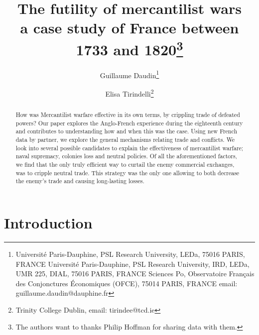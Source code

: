 \documentclass[12pt,a4paper,notitlepage,english]{article}
\author{
  Guillaume Daudin\thanks{Université Paris-Dauphine, PSL Research University, LEDa, 75016 PARIS, FRANCE Université Paris-Dauphine, PSL Research University, IRD, LEDa, UMR 225, DIAL, 75016 PARIS, FRANCE Sciences Po, Observatoire Français des Conjonctures Économiques (OFCE), 75014 PARIS, FRANCE email: guillaume.daudin@dauphine.fr}
  \and
  Elisa Tirindelli\thanks{Trinity College Dublin, email: tirindee@tcd.ie}
}
\title{The futility of mercantilist wars \\ a case study of France between 1733 and 1820\thanks{The authors want to thanks Philip Hoffman for sharing data with them.}}
\date{}
\begin{document}
\maketitle






\begin{abstract}
How was Mercantilist warfare effective in its own terms, by crippling trade of defeated powers? Our paper explores the Anglo-French experience during the eighteenth century and contributes to understanding how and when this was the case. Using new French data by partner, we explore the general mechanisms relating trade and conflicts. We look into several possible candidates to explain the effectiveness of mercantilist warfare; naval supremacy, colonies loss and neutral policies. Of all the aforementioned factors, we find that the only truly efficient way to curtail the enemy commercial exchanges, was to cripple neutral trade. This strategy was the only one allowing to both decrease the enemy's trade and causing long-lasting losses. 
\end{abstract}


\section{Introduction} \label{introduction}




\maketitle
\end{document}
